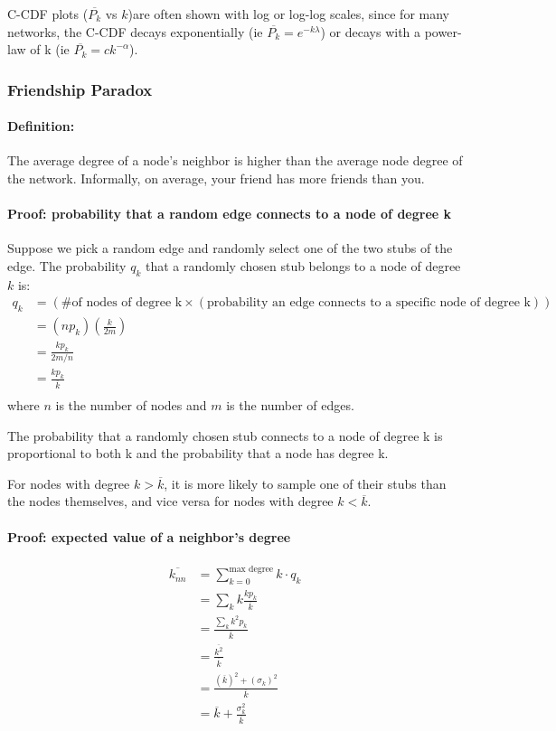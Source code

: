 \documentclass[11pt]{scrartcl} %
\begin{document}
C-CDF plots ($\overline{P_k}$ vs $k$)are often shown with log or log-log scales, since for many networks, the C-CDF decays exponentially (ie $\overline{P_k} = e^{-k\lambda}$) or decays with a power-law of k (ie $\overline{P_k} = ck^{-\alpha}$).

\subsubsection{Friendship Paradox}
\paragraph{Definition:} The average degree of a node's neighbor is higher than the average node degree of the network. Informally, on average, your friend has more friends than you.

\paragraph{Proof: probability that a random edge connects to a node of degree k} Suppose we pick a random edge and randomly select one of the two stubs of the edge. The probability $q_k$ that a randomly chosen stub belongs to a node of degree $k$ is:
\begin{align*} 
	q_k & = (\text{\# of nodes of degree k} \times (\text{probability an edge connects to a specific node of degree k})) \\
	& = (np_k)(\frac{k}{2m}) \\
	& = \frac{kp_k}{2m/n} \\
	& = \frac{kp_k}{\overline{k}} \\
\end{align*}
where $n$ is the number of nodes and $m$ is the number of edges.

The probability that a randomly chosen stub connects to a node of degree k is proportional to both k and the probability that a node has degree k. 

For nodes with degree $k>\overline{k}$, it is more likely to sample one of their stubs than the nodes themselves, and vice versa for nodes with degree $k<\overline{k}$.

\paragraph{Proof: expected value of a neighbor's degree} 

\begin{align*}
	\overline{k_{nn}} & = \sum_{k=0}^{\text{max degree}} k \cdot q_k \\
	& = \sum_{k} k \frac{k p_k}{\overline{k}} \\
	& = \frac{\sum_{k} k^2 p_k}{\overline{k}} \\
	& = \frac{\overline{k^2}}{\overline{k}} \\
	& = \frac{(\overline{k})^2 + (\sigma_k)^2}{\overline{k}} \\
	& = \overline{k} + \frac{\sigma_k^2}{\overline{k}}
\end{align*} 
\end{document}
